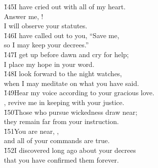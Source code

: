 \begin{poetry}
\poeml \v{145}I have cried out with all of my heart. \\
\poemll    Answer me, ! \\
\poemlll       I will observe your statutes. \\
\poeml \v{146}I have called out to you, ``Save me, \\
\poemll    so I may keep your decrees.'' \\
\poeml \v{147}I get up before dawn and cry for help; \\
\poemll    I place my hope in your word. \\
\poeml \v{148}I look forward to the night watches, \\
\poemll    when I may meditate on what you have said. \\
\poeml \v{149}Hear my voice according to your gracious love. \\
\poemll    {}, revive me in keeping with your justice. \\
\poeml \v{150}Those who pursue wickedness draw near; \\
\poemll    they remain far from your instruction. \\
\poeml \v{151}You are near, , \\
\poemll    and all of your commands are true. \\
\poeml \v{152}I discovered long ago about your decrees \\
\poemll    that you have confirmed them forever.
\end{poetry}

